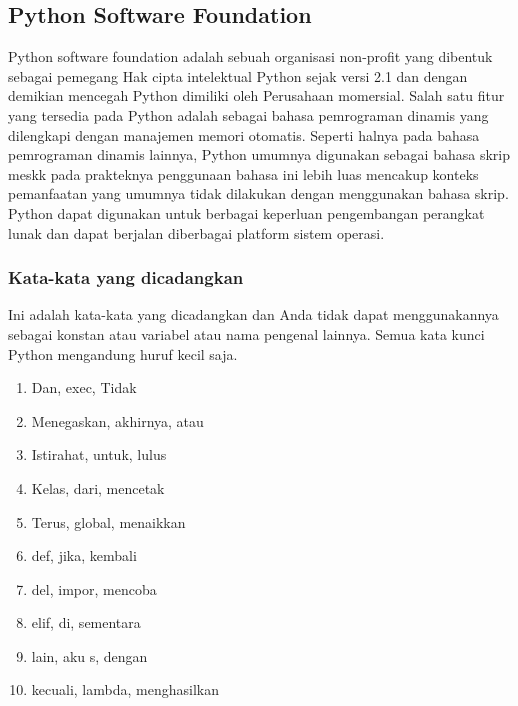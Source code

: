 \subsection{Python Software Foundation}
Python software foundation adalah sebuah organisasi non-profit yang dibentuk sebagai pemegang Hak cipta intelektual Python sejak versi 2.1 dan dengan demikian mencegah Python dimiliki oleh Perusahaan momersial. Salah satu fitur yang tersedia pada Python adalah sebagai bahasa pemrograman dinamis yang dilengkapi dengan manajemen memori otomatis. Seperti halnya pada bahasa pemrograman dinamis lainnya, Python umumnya digunakan sebagai bahasa skrip meskk pada prakteknya penggunaan bahasa ini lebih luas mencakup konteks pemanfaatan yang umumnya tidak dilakukan dengan menggunakan bahasa skrip. Python dapat digunakan untuk berbagai keperluan pengembangan perangkat lunak dan dapat berjalan diberbagai platform sistem operasi.

\subsubsection{Kata-kata yang dicadangkan}
Ini adalah kata-kata yang dicadangkan dan Anda tidak dapat menggunakannya sebagai konstan atau variabel 
atau nama pengenal lainnya. Semua kata kunci Python mengandung huruf kecil saja.
\begin{enumerate}
    \item Dan, exec, Tidak
    \item Menegaskan, akhirnya, atau
    \item Istirahat, untuk, lulus
    \item Kelas, dari, mencetak
    \item Terus, global, menaikkan
    \item def, jika, kembali
    \item del, impor, mencoba
    \item elif, di, sementara
    \item lain, aku s, dengan
    \item kecuali, lambda, menghasilkan
    \end{enumerate}

